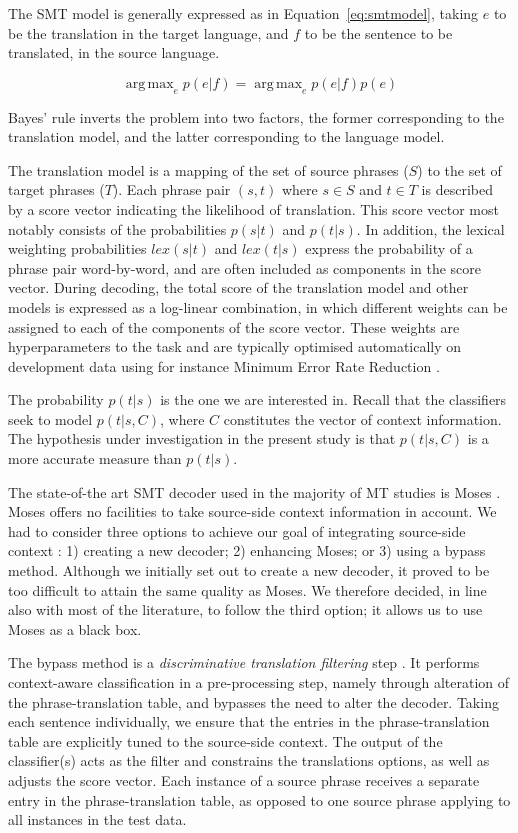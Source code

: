 \documentclass[smallextended]{svjour3}       %
\theoremstyle{break}
\DeclareMathOperator*{\argmax}{arg\,max}
\begin{document}
The SMT model is generally expressed as in Equation~\ref{eq:smtmodel}, taking $e$
to be the translation in the target language, and $f$ to be the sentence to be
translated, in the source language.

\begin{equation}
\argmax_e p(e|f) = \argmax_e p(e|f)p(e)
\label{eq:smtmodel}
\end{equation}

Bayes' rule inverts the problem into two factors, the former corresponding to
the translation model, and the latter corresponding to the language model. 

The translation model is a mapping of the set of source phrases ($S$) to the
set of target phrases ($T$). Each phrase pair $(s,t)$ where $s \in S$ and $t
\in T$ is described by a score vector indicating the likelihood of
translation. This score vector most notably consists of the probabilities
$p(s|t)$ and $p(t|s)$. In addition, the lexical weighting probabilities $lex(s|t)$
and $lex(t|s)$ express the probability of a phrase pair word-by-word, and are
often included as components in the score vector. During decoding, the total
score of the translation model and other models is expressed as a log-linear
combination, in which different weights can be assigned to each of the
components of the score vector. These weights are hyperparameters to the task and
are typically optimised automatically on development data using for instance
Minimum Error Rate Reduction \citep{MERT}.

The probability $p(t|s)$ is the one we are interested in. Recall that the
classifiers seek to model $p(t|s,C)$, where $C$ constitutes the vector of
context information. The hypothesis under investigation in the present study is
that $p(t|s,C)$ is a more accurate measure than $p(t|s)$.

The state-of-the art SMT decoder used in the majority of MT studies is Moses
\citep{MOSES}. Moses offers no facilities to take source-side context
information in account. We had to consider three options to achieve our goal of
integrating source-side context : 1) creating a new decoder; 2) enhancing
Moses; or 3) using a bypass method. Although we initially set out to create a
new decoder, it proved to be too difficult to attain the same quality as Moses.
We therefore decided, in line also with most of the literature, to follow the
third option; it allows us to use Moses as a black box.

The bypass method is a \emph{discriminative translation filtering}
step \citep{Rejwanul+11}. It performs context-aware classification in
a pre-processing step, namely through alteration of the
phrase-translation table, and bypasses the need to alter the
decoder. Taking each sentence individually, we ensure that the entries
in the phrase-translation table are explicitly tuned to the
source-side context. The output of the classifier(s) acts as the
filter and constrains the translations options, as well as adjusts the
score vector. Each instance of a source phrase receives a separate entry
in the phrase-translation table, as opposed to one source phrase
applying to all instances in the test data.
\end{document}
